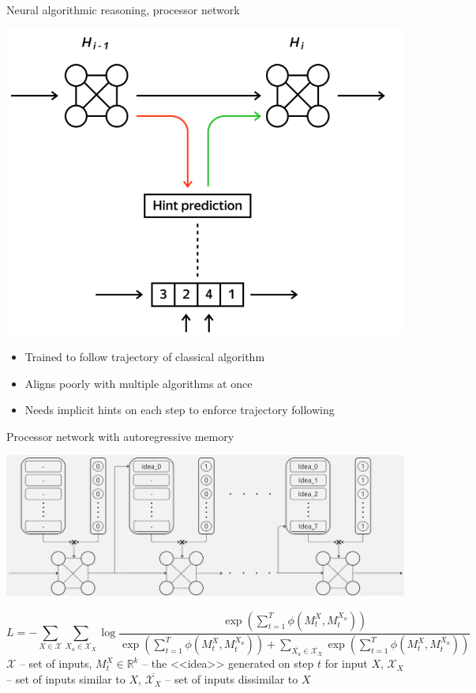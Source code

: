 \documentclass[10pt]{beamer}
\begin{document}
\begin{frame}{Neural algorithmic reasoning, processor network}
	\begin{center}
		\includegraphics[scale=0.3]{../pictures/processor with hints.png}
	\end{center}
	\begin{itemize}
		\item Trained to follow trajectory of classical algorithm
		\item Aligns poorly with multiple algorithms at once
		\item Needs implicit hints on each step to enforce trajectory following
	\end{itemize}
\end{frame}


\begin{frame}{Processor network with autoregressive memory}
	\begin{center}
		\includegraphics[scale=0.25]{../pictures/extra-ARM-GNN.png}
	\end{center}
	\begin{equation*}
		L = - \sum_{X\in \mathcal{X}}\sum\limits_{X_a \in \mathcal{X}_X}\log\frac{  \exp{\left(  \sum\limits_{t=1}^{T} \phi\left(M_t^X, M_t^{X_a}\right)  \right)}  }{  \exp{\left(  \sum_{t=1}^{T} \phi\left(M_t^X, M_t^{X_a}\right)  \right)} + \sum\limits_{\overline{X_a}\in \overline{\mathcal{X}_X}}\exp\left(\sum\limits_{t=1}^{T}\phi\left(M_t^X, M_t^{\overline{X_a}}\right)\right)  }
	\end{equation*}
		$\mathcal{X}$ -- set of inputs, $M_t^X\in \mathbb{R}^k$ -- the <<idea>> generated on step $t$ for input $X$, $\mathcal{X}_X$ -- set of inputs similar to $X$, $\overline{\mathcal{X}_X}$ -- set of inputs dissimilar to $X$
\end{frame}
\end{document}
